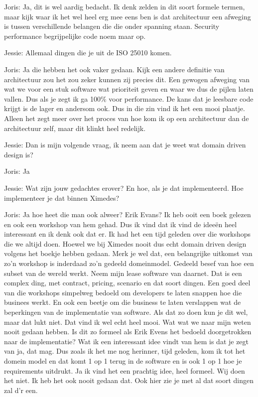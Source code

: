 Joris: Ja, dit is wel aardig bedacht. Ik denk zelden in dit soort formele termen, maar kijk waar ik het wel heel erg mee eens ben is dat architectuur een afweging is tussen verschillende belangen die die onder spanning staan. Security performance begrijpelijke code noem maar op.

Jessie: Allemaal dingen die je uit de ISO 25010 komen.

Joris: Ja die hebben het ook vaker gedaan. Kijk een andere definitie van architectuur zou het zou zeker kunnen zij precies dit. Een gewogen afweging van wat we voor een stuk software wat prioriteit geven en waar we dus de pijlen laten vallen. Dus als je zegt ik ga 100\% voor performance. De kans dat je leesbare code krijgt is de lager en andersom ook. Dus in die zin vind ik het een mooi plaatje. Alleen het zegt meer over het proces van hoe kom ik op een architectuur dan de architectuur zelf, maar dit klinkt heel redelijk.

Jessie: Dan is mijn volgende vraag, ik neem aan dat je weet wat domain driven design is?

Joris: Ja

Jessie: Wat zijn jouw gedachtes erover? En hoe, als je dat implementeerd. Hoe implementeer je dat binnen Ximedes?

Joris: Ja hoe heet die man ook alweer? Erik Evans? Ik heb ooit een boek gelezen en ook een workshop van hem gehad. Dus ik vind dat ik vind de ideeën heel interessant en ik denk ook dat er. Ik had het een tijd geleden over die workshops die we altijd doen. Hoewel we bij Ximedes nooit dus echt domain driven design volgens het boekje hebben gedaan. Merk je wel dat, een belangrijke uitkomst van zo'n workshop is inderdaad zo'n gedeeld domeinmodel. Gedeeld besef van hoe een subset van de wereld werkt. Neem mijn lease software van daarnet. Dat is een complex ding, met contract, pricing, scenario en dat soort dingen. Een goed deel van die workshops simpelweg bedoeld om developers te laten snappen hoe die businees werkt. En ook een beetje om die business te laten verslappen wat de beperkingen van de implementatie van software. Als dat zo doen kun je dit wel, maar dat lukt niet. Dat vind ik wel echt heel mooi. Wat wat we naar mijn weten nooit gedaan hebben. Is dit zo formeel als Erik Evens het bedoeld doorgetrokken naar de implementatie? Wat ik een interessant idee vindt van hem is dat je zegt van ja, dat mag. Dus zoals ik het me nog herinner, tijd geleden, kom ik tot het domein model en dat komt 1 op 1 terug in de software en is ook 1 op 1 hoe je requirements uitdrukt. Ja ik vind het een prachtig idee, heel formeel. Wij doen het niet. Ik heb het ook nooit gedaan dat. Ook hier zie je met al dat soort dingen zal d'r een.

